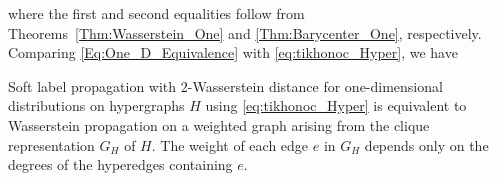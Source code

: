 \documentclass[letterpaper]{article} %
\begin{document}
where the first and second equalities follow from Theorems~\ref{Thm:Wasserstein_One} and \ref{Thm:Barycenter_One}, respectively. Comparing \eqref{Eq:One_D_Equivalence} with \eqref{eq:tikhonoc_Hyper}, we have
\begin{proposition}
  \label{prop:clique-equivalence}
  Soft label propagation with $2$-Wasserstein distance for one-dimensional distributions on hypergraphs $H$ using \eqref{eq:tikhonoc_Hyper} is equivalent to Wasserstein propagation on a weighted graph arising from the clique representation $G_H$ of $H$. The weight of each edge $e$ in $G_H$ depends only on the degrees of the hyperedges containing $e$.
\end{proposition}

\end{document}
